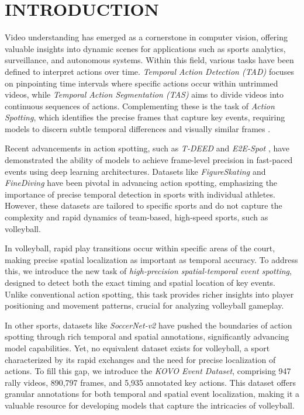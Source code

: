 \documentclass[a4paper,twoside]{article}
\begin{document}
\section{\uppercase{Introduction}}
\label{sec:introduction}
Video understanding has emerged as a cornerstone in computer vision, offering valuable insights into dynamic scenes for applications such as sports analytics, surveillance, and autonomous systems. Within this field, various tasks have been defined to interpret actions over time. \textit{Temporal Action Detection (TAD)} focuses on pinpointing time intervals where specific actions occur within untrimmed videos, while \textit{Temporal Action Segmentation (TAS)} aims to divide videos into continuous sequences of actions. Complementing these is the task of \textit{Action Spotting}, which identifies the precise frames that capture key events, requiring models to discern subtle temporal differences and visually similar frames \cite{spot22}.

Recent advancements in action spotting, such as \textit{T-DEED} \cite{tdeed23} and \textit{E2E-Spot} \cite{spot22}, have demonstrated the ability of models to achieve frame-level precision in fast-paced events using deep learning architectures. Datasets like \textit{FigureSkating} \cite{figureskating} and \textit{FineDiving} \cite{finediving} have been pivotal in advancing action spotting, emphasizing the importance of precise temporal detection in sports with individual athletes. However, these datasets are tailored to specific sports and do not capture the complexity and rapid dynamics of team-based, high-speed sports, such as volleyball.

In volleyball, rapid play transitions occur within specific areas of the court, making precise spatial localization as important as temporal accuracy. To address this, we introduce the new task of \textit{high-precision spatial-temporal event spotting}, designed to detect both the exact timing and spatial location of key events. Unlike conventional action spotting, this task provides richer insights into player positioning and movement patterns, crucial for analyzing volleyball gameplay.

In other sports, datasets like \textit{SoccerNet-v2} \cite{soccernetv2} have pushed the boundaries of action spotting through rich temporal and spatial annotations, significantly advancing model capabilities. Yet, no equivalent dataset exists for volleyball, a sport characterized by its rapid exchanges and the need for precise localization of actions. To fill this gap, we introduce the \textit{KOVO Event Dataset}, comprising 947 rally videos, 890,797 frames, and 5,935 annotated key actions. This dataset offers granular annotations for both temporal and spatial event localization, making it a valuable resource for developing models that capture the intricacies of volleyball.
\end{document}
